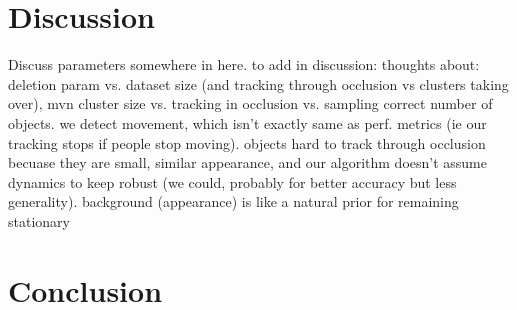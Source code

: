 \documentclass[smallcondensed, final]{svjour3}
\begin{document}
\section*{Discussion}
\label{sec:discussion}

Discuss parameters somewhere in here. to add in discussion: thoughts about: deletion param vs. dataset size (and tracking through occlusion vs clusters taking over), mvn cluster size vs. tracking in occlusion vs. sampling correct number of objects.  we detect movement, which isn’t exactly same as perf. metrics (ie our tracking stops if people stop moving). objects hard to track through occlusion becuase they are small, similar appearance, and our algorithm doesn’t assume dynamics to keep robust (we could, probably for better accuracy but less generality). background (appearance) is like a natural prior for remaining stationary




\section*{Conclusion}















\begin{small}

 
\end{small}
\end{document}
